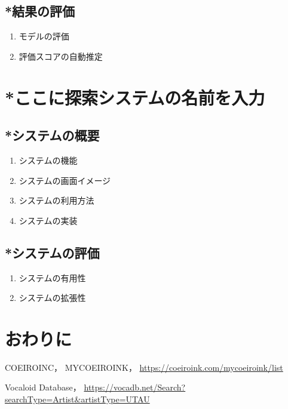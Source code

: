 \documentclass[a4j,8pt,twocolumn]{extarticle}
\begin{document}
\subsection{*結果の評価}
\begin{enumerate}
  \item モデルの評価
  \item 評価スコアの自動推定
\end{enumerate}

\section{*ここに探索システムの名前を入力}
\subsection{*システムの概要}
\begin{enumerate}
  \item システムの機能
  \item システムの画面イメージ
  \item システムの利用方法
  \item システムの実装
\end{enumerate}

\subsection{*システムの評価}
\begin{enumerate}
  \item システムの有用性
  \item システムの拡張性
\end{enumerate}

\section{おわりに}

\begin{thebibliography}{9}
COEIROINC，
MYCOEIROINK，
\url{https://coeiroink.com/mycoeiroink/list}

Vocaloid Database，
\url{https://vocadb.net/Search?searchType=Artist&artistType=UTAU}
\end{thebibliography}


\end{document}
